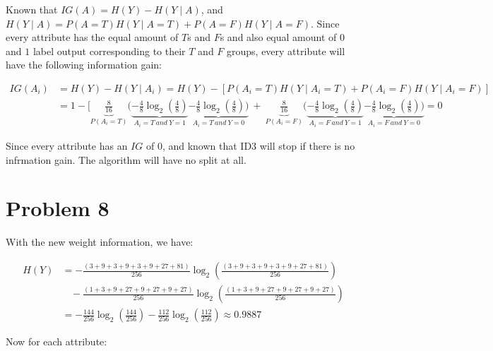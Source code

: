 \documentclass[12pt]{article}
\begin{document}
Known that $IG(A) = H(Y) - H(Y \mid A)$, and $H(Y \mid A) = P(A = T)H(Y \mid A = T) + P(A = F)H(Y \mid A = F)$. Since every attribute has the equal amount of $T$s and $F$s and also equal amount of $0$ and $1$ label output corresponding to their $T$ and $F$ groups, every attribute will have the following information gain:

\begin{align*}
    IG(A_i) &= H(Y) - H(Y \mid A_i) = H(Y) - [P(A_i = T)H(Y \mid A_i = T) + P(A_i = F)H(Y \mid A_i = F)] \\
    &= 1 - [\underbrace{\frac{8}{16}}_{P(A_i = T)}(\underbrace{-\frac{4}{8} \log_2(\frac{4}{8})}_{A_i = T \ and \ Y = 1}  \underbrace{-\frac{4}{8} \log_2(\frac{4}{8}))}_{{A_i = T \ and \ Y = 0}} \ + \ \underbrace{\frac{8}{16}}_{P(A_i = F)}(\underbrace{-\frac{4}{8} \log_2(\frac{4}{8})}_{A_i = F \ and \ Y = 1}  \underbrace{-\frac{4}{8} \log_2(\frac{4}{8}))}_{{A_i = F \ and \ Y = 0}}= 0
\end{align*}

Since every attribute has an $IG$ of $0$, and known that ID3 will stop if there is no infrmation gain. The algorithm will have no split at all.

\section{Problem 8}

With the new weight information, we have:

\begin{align*}
    H(Y) &= - \frac{(3 + 9 + 3 +9 +3 +9 + 27 + 81)}{256}\log_2(\frac{(3 + 9 + 3 +9 +3 +9 + 27 + 81)}{256}) \\ &\ \ \ \  - \frac{(1 + 3 + 9 + 27 + 9 + 27 + 9 + 27)}{256}\log_2(\frac{(1 + 3 + 9 + 27 + 9 + 27 + 9 + 27)}{256}) \\
    &= - \frac{144}{256} \log_2(\frac{144}{256}) - \frac{112}{256} \log_2(\frac{112}{256}) \approx 0.9887
\end{align*}

\noindent Now for each attribute:
\end{document}
